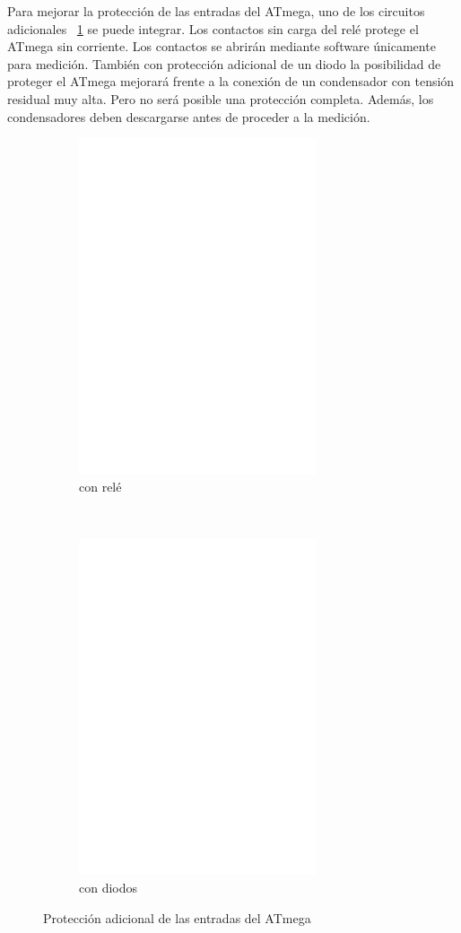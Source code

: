 Para mejorar la protección de las entradas del ATmega, uno de los circuitos adicionales~ \ref{fig:relay_addon} se puede
integrar. Los contactos sin carga del relé protege el ATmega sin corriente. Los contactos se abrirán mediante software
únicamente  para medición.  También con  protección  adicional de  un diodo  la  posibilidad de  proteger el  ATmega
mejorará frente a la conexión de un condensador con  tensión residual muy alta. Pero no será posible una protección
completa. Además, los condensadores deben descargarse antes de proceder a la medición.

\begin{figure}[H]
  \begin{subfigure}[b]{9cm}
    \centering
    \includegraphics[width=7cm]{../FIG/relay_addon.eps}
    \caption{con relé}
  \end{subfigure}
  ~
  \begin{subfigure}[b]{9cm}
    \centering
    \includegraphics[width=7cm]{../FIG/diode_addon.eps}
    \caption{con diodos}
  \end{subfigure}
  \caption{Protección adicional de las entradas del ATmega}
  \label{fig:relay_addon}
\end{figure}

